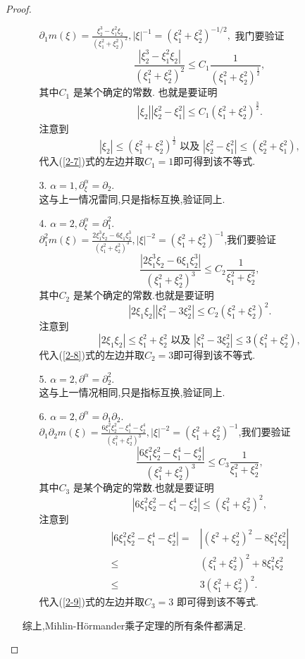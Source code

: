 \begin{proof}
\begin{enumerate}
\begin{itemize}
	  $\partial_1m(\xi)=\frac{\xi^3_2-\xi_1^2\xi_2}{(\xi_1^2+\xi_2^2)^2},|\xi|^{-1}=(\xi_1^2+\xi_2^2)^{-1 /2},$ 我门要验证
	  \[
	    \frac{|\xi_2^3-\xi_1^2\xi_2|}{(\xi_1^2+\xi_2^2)^2}\le C_1 \frac{1}{(\xi_1^2+\xi_2^2)^{\frac{1}{2}}}
	 , \]
	  其中$C_1$ 是某个确定的常数.
	  也就是要证明
	  \begin{align}
	    |\xi_2| |\xi_2^2-\xi_1^2|\le C_1 (\xi_1^2+\xi_2^2)^{\frac{3}{2}}\label{2-7}
	  .\end{align}
	  注意到
	   \[
	     |\xi_2| \le (\xi_1^2+\xi_2^2)^{\frac{1}{2}} \text{ 以及 }|\xi_2^2-\xi_1^2|\le (\xi_2^2+\xi_1^2)
	 , \]
	 代入(\ref{2-7})式的左边并取$C_1=1$即可得到该不等式.
       \item [3.] $\alpha=1,\partial_\xi^{\alpha}=\partial_2$.\\
	 这与上一情况雷同,只是指标互换,验证同上.
       \item [4.]  $\alpha=2,\partial^{\alpha}_\xi=\partial_1^2.$\\
	 $\partial_1^2 m(\xi)= \frac{2\xi_1^3\xi_2-6\xi_1\xi_2^3}{(\xi_1^2+\xi_2^2)^3},|\xi|^{-2}=(\xi_1^2+\xi_2^2)^{-1}$,我们要验证
	 \[
	   \frac{|2\xi_1^3\xi_2-6\xi_1\xi_2^3|}{(\xi_1^2+\xi_2^2)^3}\le C_2 \frac{1}{\xi_1^2+\xi_2^2},
	 \] 
	 其中$C_2$ 是某个确定的常数.也就是要证明
	 \begin{equation}\label{2-8}
	   |2\xi_1\xi_2| |\xi_1^2-3\xi_2^2|\le C_2(\xi_1^2+\xi_2^2)^2.
	 \end{equation}
	 注意到
	 \[
	   |2\xi_1\xi_2|\le \xi_1^2+\xi_2^2\text{ 以及 }|\xi_1^2-3\xi_2^2|\le 3(\xi_1^2+\xi_2^2),
	 \] 
	 代入(\ref{2-8})式的左边并取$C_2=3$即可得到该不等式.
       \item [5.] $\alpha=2,\partial^{\alpha}=\partial_2^2$.\\
	 这与上一情况相同,只是指标互换,验证同上.
       \item [6.] $\alpha=2,\partial^{\alpha}=\partial_1\partial_2$.\\
	 $\partial_1\partial_2m(\xi)= \frac{6\xi_1^2\xi_2^2-\xi_1^{4}-\xi_2^{4}}{(\xi_1^2+\xi_2^2)^3},|\xi|^{-2}=(\xi_1^2+\xi_2^2)^{-1}$,我们要验证
	 \[
	   \frac{|6\xi_1^2\xi_2^2-\xi_1^{4}-\xi_2^{4}|}{(\xi_1^2+\xi_2^2)^{3}}\le C_3 \frac{1}{\xi_1^2+\xi_2^2}
	 ,\]
	 其中$C_3$ 是某个确定的常数.也就是要证明
	 \begin{equation}\label{2-9}
	   |6\xi_1^2\xi_2^2-\xi_1^{4}-\xi_2^{4}|\le (\xi_1^2+\xi_2^2)^2,
	 \end{equation}
	 注意到
	 \begin{align*}
	   | 6\xi_1^2\xi_2^2-\xi_1^{4}-\xi_2^{4}| = & |(\xi^2+\xi_2^2)^2-8\xi_1^2\xi_2^2|\\
	   \le & (\xi_1^2+\xi_2^2)^2+8\xi_1^2\xi_2^2\\
	   \le & 3(\xi_1^2+\xi_2^2)^2 
	 .\end{align*}
	 代入(\ref{2-9})式的左边并取$C_3=3$ 即可得到该不等式.
      \end{itemize}
      综上,Mihlin-H\"{o}rmander乘子定理的所有条件都满足.
  \end{enumerate}
\end{proof}
